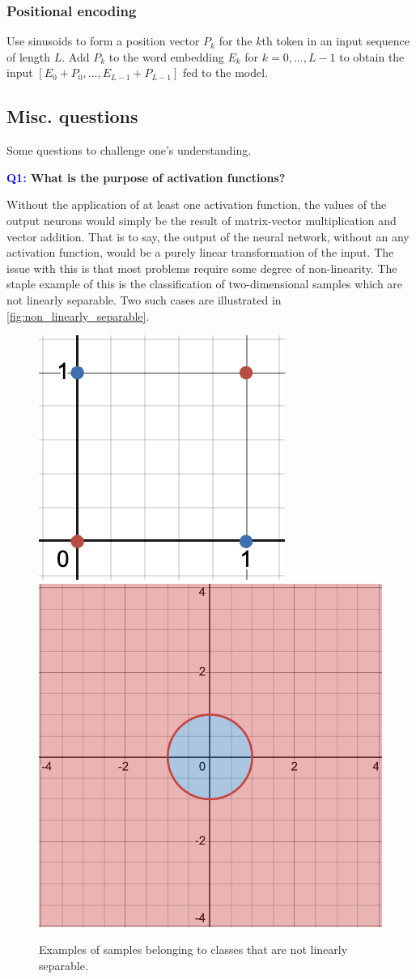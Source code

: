 \documentclass[11pt]{article}
\begin{document}
\subsubsection{Positional encoding}
\TODO{} Use sinusoids to form a position vector $P_k$ for the $k$th token in an input sequence of length $L$. Add $P_k$ to the word embedding $E_k$ for $k=0,\dots,L-1$ to obtain the input $[E_0+P_0,\dots,E_{L-1}+P_{L-1}]$ fed to the model.

\subsection{Misc. questions}

Some questions to challenge one's understanding.

\begin{center}
    \textbf{\textcolor{blue}{Q1:} What is the purpose of activation functions?}
\end{center}
Without the application of at least one activation function, the values of the output neurons would simply be the result of matrix-vector multiplication and vector addition. That is to say, the output of the neural network, without an any activation function, would be a purely linear transformation of the input. The issue with this is that most problems require some degree of non-linearity. The staple example of this is the classification of two-dimensional samples which are not linearly separable. Two such cases are illustrated in \autoref{fig:non_linearly_separable}.

\begin{figure}[t]
    \centering
    \includegraphics[width=0.40\columnwidth]{./figures/neural_nets/NLA_xor.png}
    \hspace{20pt}
    \includegraphics[width=0.40\columnwidth]{./figures/neural_nets/NLA_circle.png}
    \caption{Examples of samples belonging to classes that are not linearly separable. }
    \label{fig:non_linearly_separable}
\end{figure}
\end{document}
